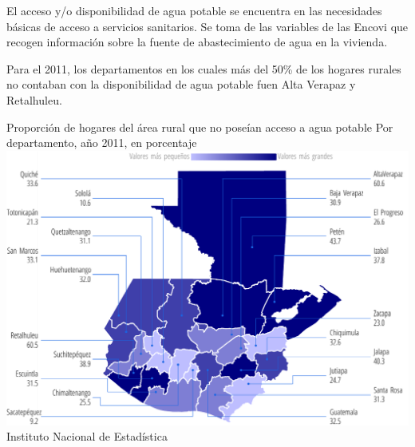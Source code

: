           {%
         El acceso y/o disponibilidad de agua potable se encuentra en las necesidades básicas de acceso a servicios sanitarios.  Se toma de las variables de las Encovi que recogen información sobre la fuente de abastecimiento de agua en la vivienda.
         
         Para el 2011, los departamentos en los cuales más del 50\% de los hogares rurales no contaban con la disponibilidad de agua potable fuen Alta Verapaz y Retalhuleu.}%
          {%
          	Proporción de hogares del área rural que no poseían acceso a agua potable
          } %
          {%
          Por departamento, año 2011, en porcentaje} %
          {%
          	\includegraphics[width=52\cuadri]{graficas/1_14.pdf}}%
          {%
          	Instituto Nacional de Estadística} %
          
          
                    
